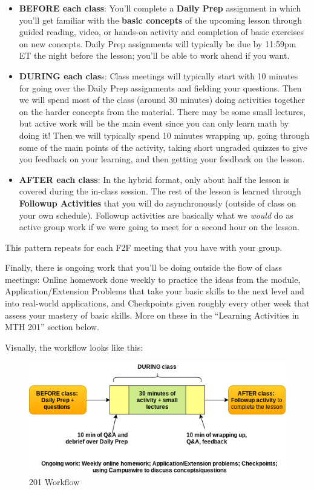 \documentclass[]{article}
\providecommand{\tightlist}{%
  \setlength{\itemsep}{0pt}\setlength{\parskip}{0pt}}
\begin{document}
\begin{itemize}
\tightlist
\item
  \textbf{BEFORE each class}: You'll complete a \textbf{Daily Prep}
  assignment in which you'll get familiar with the \textbf{basic
  concepts} of the upcoming lesson through guided reading, video, or
  hands-on activity and completion of basic exercises on new concepts.
  Daily Prep assignments will typically be due by 11:59pm ET the night
  before the lesson; you'll be able to work ahead if you want.
\item
  \textbf{DURING each clas}s: Class meetings will typically start with
  10 minutes for going over the Daily Prep assignments and fielding your
  questions. Then we will spend most of the class (around 30 minutes)
  doing activities together on the harder concepts from the material.
  There may be some small lectures, but active work will be the main
  event since you can only learn math by doing it! Then we will
  typically spend 10 minutes wrapping up, going through some of the main
  points of the activity, taking short ungraded quizzes to give you
  feedback on your learning, and then getting your feedback on the
  lesson.
\item
  \textbf{AFTER each class}: In the hybrid format, only about half the
  lesson is covered during the in-class session. The rest of the lesson
  is learned through \textbf{Followup Activities} that you will do
  asynchronously (outside of class on your own schedule). Followup
  activities are basically what we \emph{would} do as active group work
  if we were going to meet for a second hour on the lesson.
\end{itemize}

This pattern repeats for each F2F meeting that you have with your group.

Finally, there is ongoing work that you'll be doing outside the flow of
class meetings: Online homework done weekly to practice the ideas from
the module, Application/Extension Problems that take your basic skills
to the next level and into real-world applications, and Checkpoints
given roughly every other week that assess your mastery of basic skills.
More on these in the ``Learning Activities in MTH 201'' section below.

Visually, the workflow looks like this:

\begin{figure}
\centering
\includegraphics{201workflow.png}
\caption{201 Workflow}
\end{figure}
\end{document}

